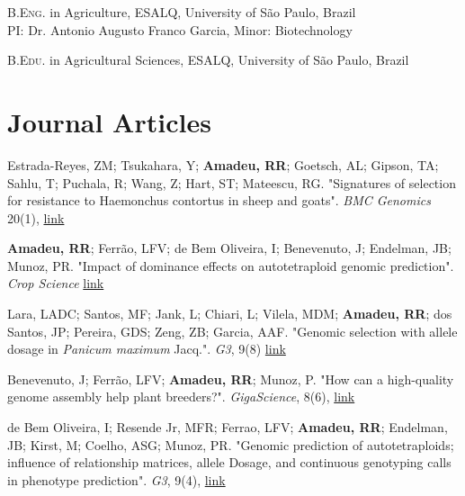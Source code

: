\documentclass[10pt, a4paper]{article}
\newcommand{\years}[1]{\marginnote{\scriptsize #1}}
\begin{document}
\years{2016}\textsc{B.Eng.} in Agriculture, ESALQ, University of São Paulo, Brazil\\
PI: Dr. Antonio Augusto Franco Garcia, Minor: Biotechnology \vspace{0.05in}

\years{2016}\textsc{B.Edu.} in Agricultural Sciences, ESALQ, University of São Paulo, Brazil


\section*{Journal Articles}

\noindent
\years{2019}Estrada-Reyes, ZM; Tsukahara, Y; \textbf{Amadeu, RR}; Goetsch, AL; Gipson, TA; Sahlu, T; Puchala, R; Wang, Z; Hart, ST; Mateescu, RG. "Signatures of selection for resistance to Haemonchus contortus in sheep and goats". \emph{BMC Genomics} 20(1), \href{https://doi.org/10.1186/s12864-019-6150-y}{link} \vspace{0.05in}

\years{2019}\textbf{Amadeu, RR}; Ferrão, LFV; de Bem Oliveira, I; Benevenuto, J; Endelman, JB; Munoz, PR. "Impact of dominance effects on autotetraploid genomic prediction". \emph{Crop Science} \href{https://doi.org/10.2135/cropsci2019.02.0138}{link} \vspace{0.05in}

\years{2019}Lara, LADC; Santos, MF; Jank, L; Chiari, L; Vilela, MDM; \textbf{Amadeu, RR}; dos Santos, JP; Pereira, GDS; Zeng, ZB; Garcia, AAF. "Genomic selection with allele dosage in \emph{Panicum maximum} Jacq.". \emph{G3}, 9(8) \href{https://doi.org/10.1534/g3.118.200986}{link} \vspace{0.05in}

\years{2019}Benevenuto, J; Ferrão, LFV; \textbf{Amadeu, RR}; Munoz, P. "How can a high-quality genome assembly help plant breeders?". \emph{GigaScience}, 8(6), \href{https://doi.org/10.1093/gigascience/giz068}{link} \vspace{0.05in}

\years{2019}de Bem Oliveira, I; Resende Jr, MFR; Ferrao, LFV; \textbf{Amadeu, RR}; Endelman, JB; Kirst, M; Coelho, ASG; Munoz, PR. "Genomic prediction of autotetraploids; influence of relationship matrices, allele Dosage, and continuous genotyping calls in phenotype prediction".  \emph{G3}, 9(4), \href{https://doi.org/10.1534/g3.119.400059}{link} \vspace{0.05in}
 
\end{document}
